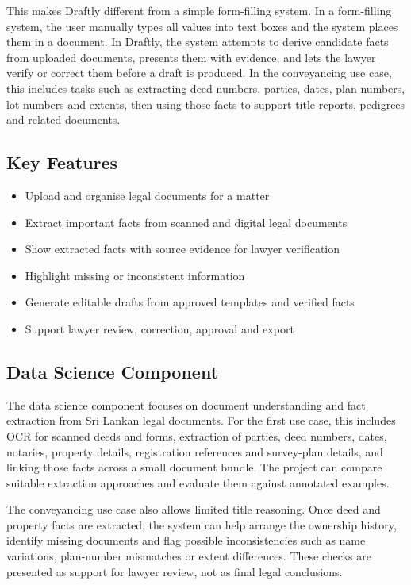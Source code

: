 \documentclass[11pt,a4paper]{article}
\begin{document}
This makes Draftly different from a simple form-filling system. In a form-filling
system, the user manually types all values into text boxes and the system places them in
a document. In Draftly, the system attempts to derive candidate facts from uploaded
documents, presents them with evidence, and lets the lawyer verify or correct them
before a draft is produced. In the conveyancing use case, this includes tasks such as
extracting deed numbers, parties, dates, plan numbers, lot numbers and extents, then
using those facts to support title reports, pedigrees and related documents.

\subsection{Key Features}
\begin{itemize}[itemsep=0pt, topsep=0pt]
  \item Upload and organise legal documents for a matter
  \item Extract important facts from scanned and digital legal documents
  \item Show extracted facts with source evidence for lawyer verification
  \item Highlight missing or inconsistent information
  \item Generate editable drafts from approved templates and verified facts
  \item Support lawyer review, correction, approval and export
\end{itemize}

\subsection{Data Science Component}
The data science component focuses on document understanding and fact extraction from
Sri Lankan legal documents. For the first use case, this includes OCR for scanned deeds
and forms, extraction of parties, deed numbers, dates, notaries, property details,
registration references and survey-plan details, and linking those facts across a small
document bundle. The project can compare suitable extraction approaches and evaluate
them against annotated examples.

The conveyancing use case also allows limited title reasoning. Once deed and property
facts are extracted, the system can help arrange the ownership history, identify missing
documents and flag possible inconsistencies such as name variations, plan-number
mismatches or extent differences. These checks are presented as support for lawyer
review, not as final legal conclusions.
\end{document}

